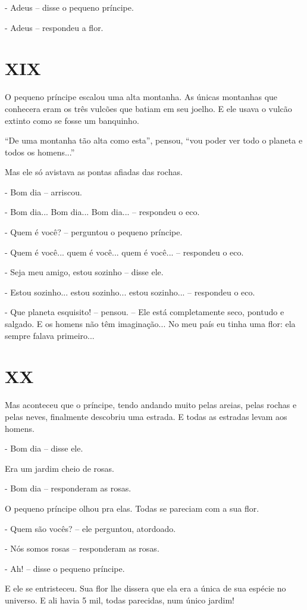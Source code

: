 - Adeus -- disse o pequeno príncipe.

- Adeus -- respondeu a flor.

\chapter{XIX}

O pequeno príncipe escalou uma alta montanha. As únicas montanhas que
conhecera eram os três vulcões que batiam em seu joelho. E ele usava o
vulcão extinto como se fosse um banquinho.

``De uma montanha tão alta como esta'', pensou, ``vou poder ver todo o
planeta e todos os homens...''

Mas ele só avistava as pontas afiadas das rochas.

- Bom dia -- arriscou.

- Bom dia... Bom dia... Bom dia... -- respondeu o eco.

- Quem é você? -- perguntou o pequeno príncipe.

- Quem é você... quem é você... quem é você... -- respondeu o eco.

- Seja meu amigo, estou sozinho -- disse ele.

- Estou sozinho... estou sozinho... estou sozinho... -- respondeu o eco.

- Que planeta esquisito! -- pensou. -- Ele está completamente seco,
pontudo e salgado. E os homens não têm imaginação... No meu país eu
tinha uma flor: ela sempre falava primeiro...

\chapter{XX}

Mas aconteceu que o príncipe, tendo andando muito pelas areias, pelas
rochas e pelas neves, finalmente descobriu uma estrada. E todas as
estradas levam aos homens.

- Bom dia -- disse ele.

Era um jardim cheio de rosas.

- Bom dia -- responderam as rosas.

O pequeno príncipe olhou pra elas. Todas se pareciam com a sua flor.

- Quem são vocês? -- ele perguntou, atordoado.

- Nós somos rosas -- responderam as rosas.

- Ah! -- disse o pequeno príncipe.

E ele se entristeceu. Sua flor lhe dissera que ela era a única de sua
espécie no universo. E ali havia 5 mil, todas parecidas, num único
jardim!

